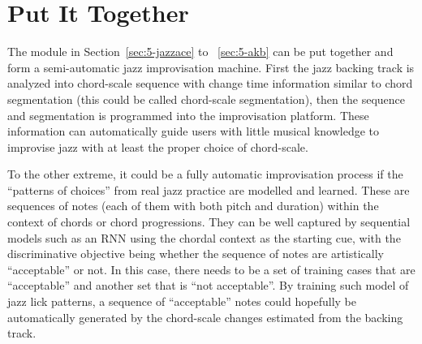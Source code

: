 \section{Put It Together}\label{sec:5-puttogether}
The module in Section~\ref{sec:5-jazzace} to ~\ref{sec:5-akb} can be put together and form a semi-automatic jazz improvisation machine. First the jazz backing track is analyzed into chord-scale sequence with change time information similar to chord segmentation (this could be called chord-scale segmentation), then the sequence and segmentation is programmed into the improvisation platform. These information can automatically guide users with little musical knowledge to improvise jazz with at least the proper choice of chord-scale.

To the other extreme, it could be a fully automatic improvisation process if the ``patterns of choices'' from real jazz practice \cite{jazzguitarimpro,pracjazz} are modelled and learned. These are sequences of notes (each of them with both pitch and duration) within the context of chords or chord progressions. They can be well captured by sequential models such as an RNN using the chordal context as the starting cue, with the discriminative objective being whether the sequence of notes are artistically ``acceptable'' or not. In this case, there needs to be a set of training cases that are ``acceptable'' and another set that is ``not acceptable''. By training such model of jazz lick patterns, a sequence of ``acceptable'' notes could hopefully be automatically generated by the chord-scale changes estimated from the backing track.

 




 






